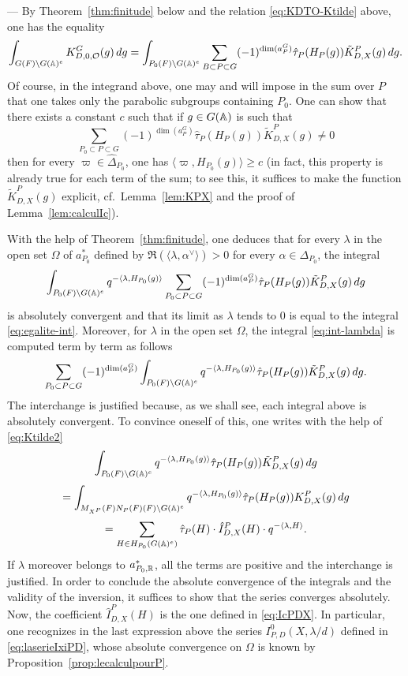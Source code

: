 \begin{paragr} ---\label{S:preuve-calcul}
By Theorem~\ref{thm:finitude} below and the relation \eqref{eq:KDTO-Ktilde} above, one has the equality
\begin{equation}
  \label{eq:egalite-int}
  \int_{G(F)\backslash G(\mathbb{A})^e} K^G_{D,0,\mathcal{O}}(g)\, dg=\int_{P_0(F)\backslash G(\mathbb{A})^e}\sum_{B\subset P\subset G} (-1)^{\dim(a_P^G)}\hat{\tau}_P(H_P(g))\tilde{K}^P_{D,X}(g)\, dg.
\end{equation}
Of course, in the integrand above, one may and will impose in the sum over $P$ that one takes only the parabolic subgroups containing $P_0$. One can show that there exists a constant $c$ such that if $g\in G(\mathbb{A})$ is such that
$$\sum_{P_0\subset P\subset G} (-1)^{\dim(a_P^G)}\hat{\tau}_P(H_P(g))\tilde{K}^P_{D,X}(g)\neq 0$$
then for every $\varpi\in \hat{\Delta}_{P_0}$, one has $\langle \varpi,H_{P_0}(g)\rangle \geq c$ (in fact, this property is already true for each term of the sum; to see this, it suffices to make the function $\tilde{K}^P_{D,X}(g)$ explicit, cf.\ Lemma~\ref{lem:KPX} and the proof of Lemma~\ref{lem:calculIc}).

With the help of Theorem~\ref{thm:finitude}, one deduces that for every $\lambda$ in the open set $\Omega$ of $a^*_{P_0}$ defined by $\Re(\langle \lambda,\alpha^\vee\rangle)>0$ for every $\alpha\in \Delta_{P_0}$, the integral
\begin{equation}
  \label{eq:int-lambda}
  \int_{P_0(F)\backslash G(\mathbb{A})^e} q^{-\langle \lambda,H_{P_0}(g)\rangle}\sum_{P_0\subset P\subset G} (-1)^{\dim(a_P^G)}\hat{\tau}_P(H_P(g))\tilde{K}^P_{D,X}(g)\, dg
\end{equation}
is absolutely convergent and that its limit as $\lambda$ tends to $0$ is equal to the integral \eqref{eq:egalite-int}. Moreover, for $\lambda$ in the open set $\Omega$, the integral \eqref{eq:int-lambda} is computed term by term as follows
$$\sum_{P_0\subset P\subset G} (-1)^{\dim(a_P^G)}\int_{P_0(F)\backslash G(\mathbb{A})^e} q^{-\langle \lambda,H_{P_0}(g)\rangle}\hat{\tau}_P(H_P(g))\tilde{K}^P_{D,X}(g)\, dg.$$
The interchange is justified because, as we shall see, each integral above is absolutely convergent. To convince oneself of this, one writes with the help of \eqref{eq:Ktilde2}
$$\int_{P_0(F)\backslash G(\mathbb{A})^e} q^{-\langle \lambda,H_{P_0}(g)\rangle}\hat{\tau}_P(H_P(g))\tilde{K}^P_{D,X}(g)\, dg$$
$$=\int_{M_{X^P}(F)N_P(F)(F)\backslash G(\mathbb{A})^e} q^{-\langle \lambda,H_{P_0}(g)\rangle}\hat{\tau}_P(H_P(g))K^P_{D,X}(g)\, dg$$
$$=\sum_{H\in H_{P_0}(G(\mathbb{A})^e)} \hat{\tau}_P(H)\cdot \hat{I}^P_{D,X}(H)\cdot q^{-\langle \lambda,H\rangle}.$$
If $\lambda$ moreover belongs to $a^*_{P_0,\mathbb{R}}$, all the terms are positive and the interchange is justified. In order to conclude the absolute convergence of the integrals and the validity of the inversion, it suffices to show that the series converges absolutely. Now, the coefficient $\hat{I}^P_{D,X}(H)$ is the one defined in \eqref{eq:IcPDX}. In particular, one recognizes in the last expression above the series $I^0_{P,D}(X,\lambda/d)$ defined in \eqref{eq:laserieIxiPD}, whose absolute convergence on $\Omega$ is known by Proposition~\ref{prop:lecalculpourP}.


\end{paragr}
